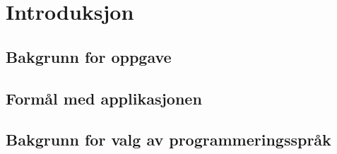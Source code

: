 \chapter{Introduksjon}
\label{chp:introduction}

\section{Bakgrunn for oppgave}
\label{sec:background}



\section{Formål med applikasjonen}
\label{sec:objectives}



\section{Bakgrunn for valg av programmeringsspråk}
